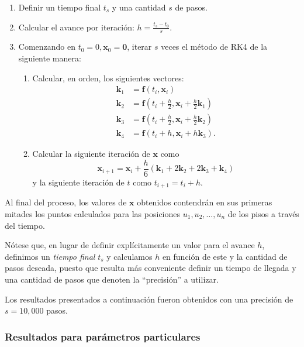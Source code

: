 \begin{enumerate}
    \item Definir un tiempo final \(t_s\) y una cantidad \(s\) de pasos.
    \item Calcular el avance por iteración: \(h = \frac{t_s - t_0}{s}\).
    \item Comenzando en \(t_0 = 0, \mathbf{x}_0 = \mathbf{0}\), iterar \(s\) veces el método de RK4 de la siguiente manera:
        \begin{enumerate}

            \item Calcular, en orden, los siguientes vectores:
                \begin{align*}
                    \mathbf{k}_1 &= \mathbf{f}(t_i, \mathbf{x}_i) \\
                    \mathbf{k}_2 &= \mathbf{f}(t_i + \frac{h}{2}, \mathbf{x}_i + \frac{h}{2}\mathbf{k}_1) \\
                    \mathbf{k}_3 &= \mathbf{f}(t_i + \frac{h}{2}, \mathbf{x}_i + \frac{h}{2}\mathbf{k}_2) \\
                    \mathbf{k}_4 &= \mathbf{f}(t_i + h, \mathbf{x}_i + h\mathbf{k}_3)
                .\end{align*}

            \item Calcular la siguiente iteración de \(\mathbf{x}\) como
                \[
                    \mathbf{x}_{i+1} = \mathbf{x}_i + \frac{h}{6}(\mathbf{k}_1 + 2\mathbf{k}_2 + 2\mathbf{k}_3 + \mathbf{k}_4)
                \]
                y la siguiente iteración de \(t\) como \(t_{i+1} = t_i + h\).
        \end{enumerate}
\end{enumerate}

Al final del proceso, los valores de \(\mathbf{x}\) obtenidos contendrán en sus primeras mitades los puntos calculados para las posiciones \(u_1, u_2, \ldots, u_n\) de los pisos a través del tiempo.

Nótese que, en lugar de definir explícitamente un valor para el avance \(h\), definimos un \textit{tiempo final} \(t_s\) y calculamos \(h\) en función de este y la cantidad de pasos deseada, puesto que resulta más conveniente definir un tiempo de llegada y una cantidad de pasos que denoten la ``precisión'' a utilizar.

Los resultados presentados a continuación fueron obtenidos con una precisión de \(s = 10,000\) pasos.

\subsubsection*{Resultados para parámetros particulares}

